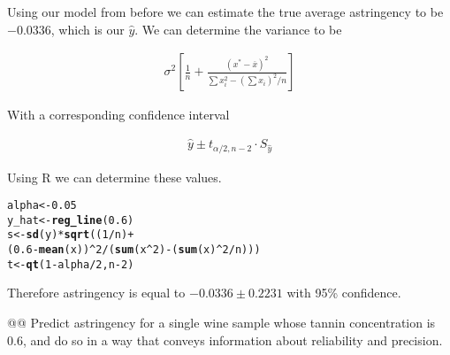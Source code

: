 \documentclass[10pt]{article}\usepackage[]{graphicx}\usepackage[]{xcolor}
\makeatletter
\newcommand{\hlnum}[1]{\textcolor[rgb]{0.686,0.059,0.569}{#1} }%
\newcommand{\hlopt}[1]{\textcolor[rgb]{0,0,0}{#1} }%
\newcommand{\hlstd}[1]{\textcolor[rgb]{0.345,0.345,0.345}{#1} }%
\newcommand{\hlkwb}[1]{\textcolor[rgb]{0.69,0.353,0.396}{#1} }%
\newcommand{\hlkwd}[1]{\textcolor[rgb]{0.737,0.353,0.396}{\textbf{#1} } }%
\newenvironment{kframe}{%
 \def\at@end@of@kframe{}%
 \ifinner\ifhmode%
  \def\at@end@of@kframe{\end{minipage} }%
  \begin{minipage}{\columnwidth}%
 \fi\fi%
 \def\FrameCommand##1{\hskip\@totalleftmargin \hskip-\fboxsep
 \colorbox{shadecolor}{##1}\hskip-\fboxsep
     \hskip-\linewidth \hskip-\@totalleftmargin \hskip\columnwidth}%
 \MakeFramed {\advance\hsize-\width
   \@totalleftmargin\z@ \linewidth\hsize
   \@setminipage} }%
 {\par\unskip\endMakeFramed%
 \at@end@of@kframe}
\newenvironment{knitrout}{}{} %
\makeatother
\begin{document}
\begin{easylist}[enumerate]
    Using our model from before we can estimate the true average astringency to be $-0.0336$, which is our
    $\hat{y}$. We can determine the variance to be

    \begin{equation}
        \begin{aligned}
            \sigma^2 \left[
                \frac{1}{n} + \frac{ {\left( x^* - \overline{x} \right)}^2}
                                {\sum x_i^2 - \left( \sum x_i \right)^2 / n}
            \right]
        \end{aligned}
    \end{equation}

    With a corresponding confidence interval

    \begin{equation}
        \begin{aligned}
            \hat{y} \pm t_{\alpha / 2, n - 2} \cdot S_{\hat{y} }
        \end{aligned}
    \end{equation}

    Using R we can determine these values.

\begin{knitrout}
\color{fgcolor}\begin{kframe}
\begin{alltt}
         \hlstd{alpha} \hlkwb{<-} \hlnum{0.05}
         \hlstd{y_hat} \hlkwb{<-} \hlkwd{reg_line}\hlstd{(}\hlnum{0.6}\hlstd{)}
         \hlstd{s} \hlkwb{<-} \hlkwd{sd}\hlstd{(y)} \hlopt{*} \hlkwd{sqrt}\hlstd{((}\hlnum{1}\hlopt{/}\hlstd{n)} \hlopt{+}
                      \hlstd{(}\hlnum{0.6} \hlopt{-} \hlkwd{mean}\hlstd{(x))}\hlopt{^}\hlnum{2}\hlopt{/}\hlstd{(}\hlkwd{sum}\hlstd{(x}\hlopt{^}\hlnum{2}\hlstd{)} \hlopt{-} \hlstd{(}\hlkwd{sum}\hlstd{(x)}\hlopt{^}\hlnum{2}\hlopt{/}\hlstd{n)))}
         \hlstd{t} \hlkwb{<-} \hlkwd{qt}\hlstd{(}\hlnum{1} \hlopt{-} \hlstd{alpha} \hlopt{/} \hlnum{2}\hlstd{, n} \hlopt{-} \hlnum{2}\hlstd{)}
\end{alltt}
\end{kframe}
\end{knitrout}


    Therefore astringency is equal to $-0.0336 \pm 0.2231$ with 95\% confidence.

    @@ Predict astringency for a single wine sample whose tannin concentration is 0.6, and do so in a way that conveys
    information about reliability and precision.\newline


\end{easylist}
\end{document}
